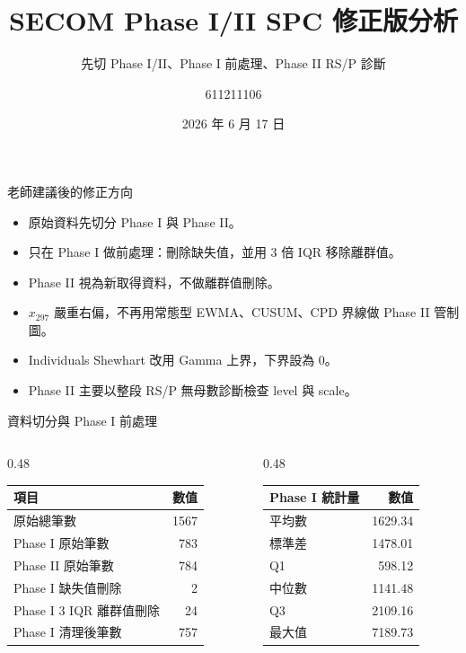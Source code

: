 \documentclass[aspectratio=169,12pt]{beamer}
\title{SECOM Phase I/II SPC 修正版分析}
\subtitle{先切 Phase I/II、Phase I 前處理、Phase II RS/P 診斷}
\author{611211106}
\date{2026 年 6 月 17 日}
\begin{document}
\begin{frame}
\titlepage
\end{frame}

\begin{frame}{老師建議後的修正方向}
\begin{itemize}
  \item 原始資料先切分 Phase I 與 Phase II。
  \item 只在 Phase I 做前處理：刪除缺失值，並用 3 倍 IQR 移除離群值。
  \item Phase II 視為新取得資料，不做離群值刪除。
  \item \(x_{297}\) 嚴重右偏，不再用常態型 EWMA、CUSUM、CPD 界線做 Phase II 管制圖。
  \item Individuals Shewhart 改用 Gamma 上界，下界設為 0。
  \item Phase II 主要以整段 RS/P 無母數診斷檢查 level 與 scale。
\end{itemize}
\end{frame}

\begin{frame}{資料切分與 Phase I 前處理}
\begin{columns}[T]
\begin{column}{0.48\linewidth}
\begin{table}
\centering
\begin{tabular}{lr}
\toprule
項目 & 數值 \\
\midrule
原始總筆數 & 1567 \\
Phase I 原始筆數 & 783 \\
Phase II 原始筆數 & 784 \\
Phase I 缺失值刪除 & 2 \\
Phase I 3 IQR 離群值刪除 & 24 \\
Phase I 清理後筆數 & 757 \\
\bottomrule
\end{tabular}
\end{table}
\end{column}
\begin{column}{0.48\linewidth}
\begin{table}
\centering
\begin{tabular}{lr}
\toprule
Phase I 統計量 & 數值 \\
\midrule
平均數 & 1629.34 \\
標準差 & 1478.01 \\
Q1 & 598.12 \\
中位數 & 1141.48 \\
Q3 & 2109.16 \\
最大值 & 7189.73 \\
\bottomrule
\end{tabular}
\end{table}
\end{column}
\end{columns}
\end{frame}
\end{document}

